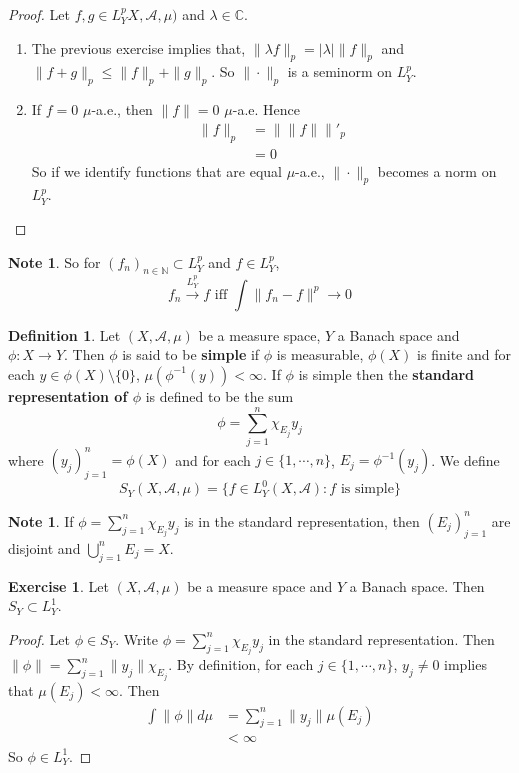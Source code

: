 \documentclass[12pt]{amsart}
\theoremstyle{definition}
\newtheorem{defn}[definition]{Definition}
\newtheorem{note}[definition]{Note}
\newtheorem{ex}[definition]{Exercise}
\newcommand{\lam}{\lambda}
\newcommand{\C}{\mathbb{C}}
\newcommand{\N}{\mathbb{N}}
\newcommand{\MA}{\mathcal{A}}
\newcommand{\conv}[1]{\xrightarrow{#1}}
\newcommand{\ld}[1]{\label{defn:#1}}
\begin{document}
	\begin{proof} 
	Let $f, g \in L^p_YX, \MA, \mu)$ and $\lam \in \C$. 
	\begin{enumerate}
	\item The previous exercise implies that, $\|\lam f\|_p = |\lam|\|f\|_p$ and $\|f+g\|_p \leq \|f\|_p + \|g \|_p$. So $\|\cdot\|_p$ is a seminorm on $L_Y^p$.
	\item If $f = 0$ $\mu$-a.e., then $\|f\| = 0$  $\mu$-a.e. Hence
	\begin{align*}
	\|f\|_p 
	&= \|\|f\|\|'_p \\
	&= 0
\end{align*}
	So if we identify functions that are equal $\mu$-a.e., $\|\cdot\|_p$ becomes a norm on $L^p_Y$. 	  
	\end{enumerate}
	\end{proof}
	
	\begin{note}
	So for $(f_n)_{n \in \N} \subset L^p_Y$ and $f \in L^p_Y$, $$f_n \conv{L^p_Y} f \text{ iff } \int \|f_n - f\|^p \rightarrow 0$$ 
	\end{note}
	
	\begin{defn} \ld{00000} 
	Let $(X, \MA, \mu)$ be a measure space, $Y$ a Banach space and $\phi: X \rightarrow Y$. Then $\phi$ is said to be \textbf{simple} if $\phi$ is measurable, $\phi(X)$ is finite and for each $y \in \phi(X) \setminus \{0\}$, $\mu(\phi^{-1}(y)) < \infty$. If $\phi$ is simple then the \textbf{standard representation of $\phi$} is defined to be the sum $$\phi = \sum\limits_{j=1}^n \chi_{E_j}y_j$$ where $(y_j)_{j=1}^n = \phi(X)$ and for each $j \in \{1, \cdots, n\}$, $E_j = \phi^{-1}(y_j)$. We define $$S_Y(X, \MA, \mu) = \{f \in L_Y^0(X, \MA): f \text{ is simple}\}$$
	\end{defn}
	
	\begin{note}
	If $\phi = \sum\limits_{j=1}^n \chi_{E_j}y_j$ is in the standard representation, then $(E_j)_{j=1}^n$ are disjoint and $\bigcup\limits_{j=1}^n E_j = X$.
	\end{note}
	
	\begin{ex}
	Let $(X, \MA, \mu)$ be a measure space and $Y$ a Banach space. Then $S_Y \subset L^1_Y$. 
	\end{ex}
	
	\begin{proof}
	Let $\phi \in S_Y$. Write $\phi = \sum\limits_{j=1}^n \chi_{E_j}y_j$ in the standard representation. Then $\|\phi\| = \sum\limits_{j=1}^n \|y_j\|\chi_{E_j}$. By definition, for each $j \in \{1, \cdots, n\}$, $y_j \neq 0$ implies that $\mu(E_j) < \infty$. Then 
	\begin{align*}
	\int \|\phi\| d\mu 
	&= \sum\limits_{j=1}^n \|y_j\| \mu(E_j) \\
	&< \infty
	\end{align*}
	So $\phi \in L^1_Y$.
	\end{proof}
	
\end{document}
